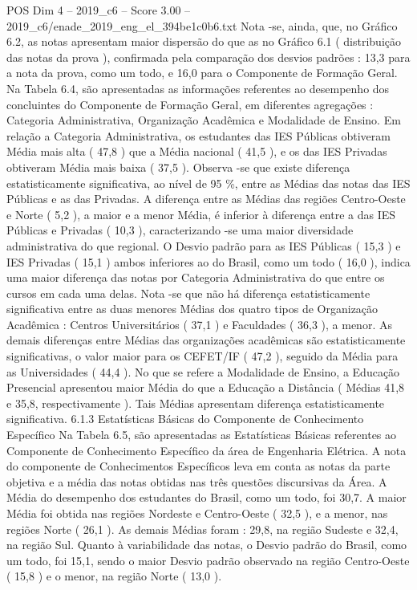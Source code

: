 \begin{textsample}{POS Dim 4 – 2019\_c6 – Score 3.00 – 2019\_c6/enade\_2019\_eng\_el\_394be1c0b6.txt}
Nota -se, ainda, que, no Gráfico 6.2, as notas apresentam maior dispersão do que as no Gráfico 6.1 ( distribuição das notas da prova ), confirmada pela comparação dos desvios padrões : 13,3 para a nota da prova, como um todo, e 16,0 para o Componente de Formação Geral.
Na Tabela 6.4, são apresentadas as informações referentes ao desempenho dos concluintes do Componente de Formação Geral, em diferentes agregações : Categoria Administrativa, Organização Acadêmica e Modalidade de Ensino.
Em relação a Categoria Administrativa, os estudantes das IES Públicas obtiveram Média mais alta ( 47,8 ) que a Média nacional ( 41,5 ), e os das IES Privadas obtiveram Média mais baixa ( 37,5 ).
Observa -se que existe diferença estatisticamente significativa, ao nível de 95 \%, entre as Médias das notas das IES Públicas e as das Privadas.
A diferença entre as Médias das regiões Centro-Oeste e Norte ( 5,2 ), a maior e a menor Média, é inferior à diferença entre a das IES Públicas e Privadas ( 10,3 ), caracterizando -se uma maior diversidade administrativa do que regional.
O Desvio padrão para as IES Públicas ( 15,3 ) e IES Privadas ( 15,1 ) ambos inferiores ao do Brasil, como um todo ( 16,0 ), indica uma maior diferença das notas por Categoria Administrativa do que entre os cursos em cada uma delas.
Nota -se que não há diferença estatisticamente significativa entre as duas menores Médias dos quatro tipos de Organização Acadêmica : Centros Universitários ( 37,1 ) e Faculdades ( 36,3 ), a menor.
As demais diferenças entre Médias das organizações acadêmicas são estatisticamente significativas, o valor maior para os CEFET/IF ( 47,2 ), seguido da Média para as Universidades ( 44,4 ).
No que se refere a Modalidade de Ensino, a Educação Presencial apresentou maior Média do que a Educação a Distância ( Médias 41,8 e 35,8, respectivamente ).
Tais Médias apresentam diferença estatisticamente significativa. 6.1.3 Estatísticas Básicas do Componente de Conhecimento Específico Na Tabela 6.5, são apresentadas as Estatísticas Básicas referentes ao Componente de Conhecimento Específico da área de Engenharia Elétrica.
A nota do componente de Conhecimentos Específicos leva em conta as notas da parte objetiva e a média das notas obtidas nas três questões discursivas da Área.
A Média do desempenho dos estudantes do Brasil, como um todo, foi 30,7.
A maior Média foi obtida nas regiões Nordeste e Centro-Oeste ( 32,5 ), e a menor, nas regiões Norte ( 26,1 ).
As demais Médias foram : 29,8, na região Sudeste e 32,4, na região Sul.
Quanto à variabilidade das notas, o Desvio padrão do Brasil, como um todo, foi 15,1, sendo o maior Desvio padrão observado na região Centro-Oeste ( 15,8 ) e o menor, na região Norte ( 13,0 ).

\end{textsample}
